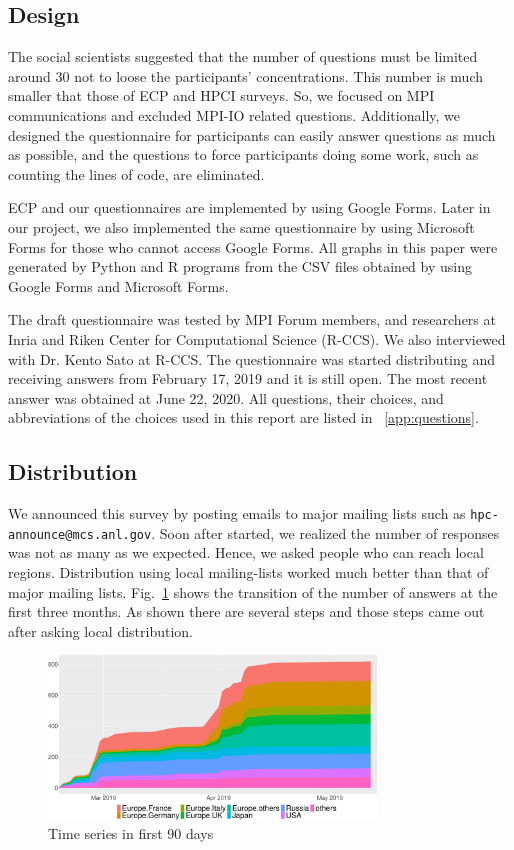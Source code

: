 \documentclass[preprint,5p,times]{elsarticle}
\begin{document}
\subsection*{Design}
%
The social scientists suggested that the number of questions must be
limited around 30 not to loose the participants' concentrations.
This number is much smaller that those of ECP and HPCI surveys. So, we
focused on MPI communications and excluded MPI-IO related
questions. Additionally, we designed the questionnaire for
participants can easily answer questions as much as possible, and
the questions to force participants doing some work, such as
counting the lines of code, are eliminated.

ECP and our questionnaires are implemented by using Google Forms. Later
in our project, we also implemented the same questionnaire by using
Microsoft Forms for those who cannot access Google Forms. All graphs
in this paper were generated by Python and R programs from the CSV files
obtained by using Google Forms and Microsoft Forms.

The draft questionnaire was tested by MPI Forum members, and
researchers at Inria and Riken Center for Computational Science
(R-CCS). We also interviewed with Dr. Kento Sato at R-CCS.
The questionnaire was started distributing and receiving answers from
February 17, 2019 and it is still open. The most recent answer was
obtained at June 22, 2020. All questions, their choices, and
abbreviations of the choices used in this report are listed in
~\ref{app:questions}.

\subsection*{Distribution}

We announced this survey by posting emails to major mailing lists such
as {\tt hpc-announce@mcs.anl.gov}. Soon after started, we realized the
number of responses was not as many as we expected. Hence, we asked
people who can reach local regions. Distribution using local
mailing-lists worked much better than that of major mailing
lists. Fig.~\ref{fig:time-series} shows the transition of the number
of answers at the first three months. As shown there are several steps
and those steps came out after asking local distribution.

\begin{figure}[htb]
  \begin{center}
    \includegraphics[width=8.7cm]{R-scripts/TimeSeries.pdf}
    \caption{Time series in first 90 days}
    \label{fig:time-series}
  \end{center}
\end{figure}
\end{document}
